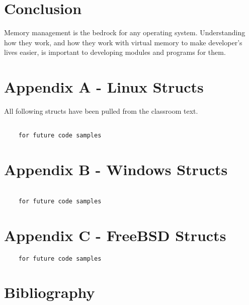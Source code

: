   \section{Conclusion}
	Memory management is the bedrock for any operating system. Understanding
	how they work, and how they work with virtual memory to make developer's
	lives easier, is important to developing modules and programs for them.

  \clearpage
  \section{Appendix A - Linux Structs}
  All following structs have been pulled from the classroom text. \cite{robertlove2010}
  \begin{lstlisting}

    for future code samples

  \end{lstlisting}

  \section{Appendix B - Windows Structs}
  \begin{lstlisting}

    for future code samples
  \end{lstlisting}
  \section{Appendix C - FreeBSD Structs}
  \begin{lstlisting}
    for future code samples

  \end{lstlisting}

  \section{Bibliography}
%   
%   
%
% 
